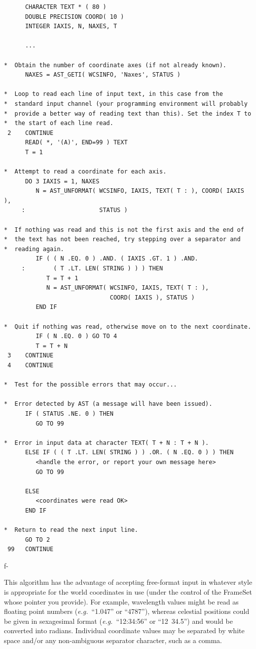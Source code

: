 \documentclass[twoside,11pt]{article}
\begin{document}
\begin{verbatim}
      CHARACTER TEXT * ( 80 )
      DOUBLE PRECISION COORD( 10 )
      INTEGER IAXIS, N, NAXES, T

      ...

*  Obtain the number of coordinate axes (if not already known).
      NAXES = AST_GETI( WCSINFO, 'Naxes', STATUS )

*  Loop to read each line of input text, in this case from the
*  standard input channel (your programming environment will probably
*  provide a better way of reading text than this). Set the index T to
*  the start of each line read.
 2    CONTINUE
      READ( *, '(A)', END=99 ) TEXT
      T = 1

*  Attempt to read a coordinate for each axis.
      DO 3 IAXIS = 1, NAXES
         N = AST_UNFORMAT( WCSINFO, IAXIS, TEXT( T : ), COORD( IAXIS ),
     :                     STATUS )

*  If nothing was read and this is not the first axis and the end of
*  the text has not been reached, try stepping over a separator and
*  reading again.
         IF ( ( N .EQ. 0 ) .AND. ( IAXIS .GT. 1 ) .AND.
     :        ( T .LT. LEN( STRING ) ) ) THEN
            T = T + 1
            N = AST_UNFORMAT( WCSINFO, IAXIS, TEXT( T : ),
                              COORD( IAXIS ), STATUS )
         END IF

*  Quit if nothing was read, otherwise move on to the next coordinate.
         IF ( N .EQ. 0 ) GO TO 4
         T = T + N
 3    CONTINUE
 4    CONTINUE

*  Test for the possible errors that may occur...

*  Error detected by AST (a message will have been issued).
      IF ( STATUS .NE. 0 ) THEN
         GO TO 99

*  Error in input data at character TEXT( T + N : T + N ).
      ELSE IF ( ( T .LT. LEN( STRING ) ) .OR. ( N .EQ. 0 ) ) THEN
         <handle the error, or report your own message here>
         GO TO 99

      ELSE
         <coordinates were read OK>
      END IF

*  Return to read the next input line.
      GO TO 2
 99   CONTINUE
\end{verbatim}
\normalsize
f-

This algorithm has the advantage of accepting free-format input in
whatever style is appropriate for the world coordinates in use (under
the control of the FrameSet whose pointer you provide). For example,
wavelength values might be read as floating point numbers
({\em{e.g.}}\ ``1.047'' or ``4787''), whereas celestial positions
could be given in sexagesimal format ({\em{e.g.}}\ ``12:34:56'' or
``12~34.5'') and would be converted into radians. Individual
coordinate values may be separated by white space and/or any
non-ambiguous separator character, such as a comma.
\end{document}
